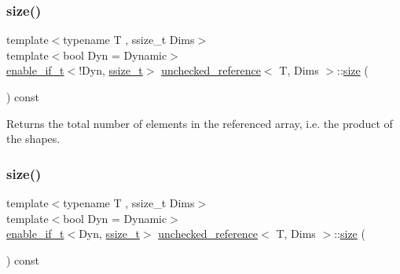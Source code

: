 \subsubsection{\texorpdfstring{size()}{size()}\hspace{0.1cm}{\footnotesize\ttfamily [1/2]}}
{\footnotesize\ttfamily template$<$typename T , ssize\+\_\+t Dims$>$ \\
template$<$bool Dyn = Dynamic$>$ \\
\mbox{\hyperlink{detail_2common_8h_a012819c9e8b5e04872a271f50f8b8196}{enable\+\_\+if\+\_\+t}}$<$!Dyn, \mbox{\hyperlink{detail_2common_8h_ac430d16fc097b3bf0a7469cfd09decda}{ssize\+\_\+t}}$>$ \mbox{\hyperlink{classunchecked__reference}{unchecked\+\_\+reference}}$<$ T, Dims $>$\+::\mbox{\hyperlink{_s_d_l__opengl__glext_8h_a3d1e3edfcf61ca2d831883e1afbad89e}{size}} (\begin{DoxyParamCaption}{ }\end{DoxyParamCaption}) const\hspace{0.3cm}{\ttfamily [inline]}}



Returns the total number of elements in the referenced array, i.\+e. the product of the shapes. 

\mbox{\label{classunchecked__reference_a57965f6ebdfe65d50947decec3a4896b}} 
\subsubsection{\texorpdfstring{size()}{size()}\hspace{0.1cm}{\footnotesize\ttfamily [2/2]}}
{\footnotesize\ttfamily template$<$typename T , ssize\+\_\+t Dims$>$ \\
template$<$bool Dyn = Dynamic$>$ \\
\mbox{\hyperlink{detail_2common_8h_a012819c9e8b5e04872a271f50f8b8196}{enable\+\_\+if\+\_\+t}}$<$Dyn, \mbox{\hyperlink{detail_2common_8h_ac430d16fc097b3bf0a7469cfd09decda}{ssize\+\_\+t}}$>$ \mbox{\hyperlink{classunchecked__reference}{unchecked\+\_\+reference}}$<$ T, Dims $>$\+::\mbox{\hyperlink{_s_d_l__opengl__glext_8h_a3d1e3edfcf61ca2d831883e1afbad89e}{size}} (\begin{DoxyParamCaption}{ }\end{DoxyParamCaption}) const\hspace{0.3cm}{\ttfamily [inline]}}



